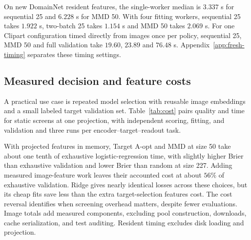 On new DomainNet resident features, the single-worker median is $3.337$ s for sequential 25 and $6.228$ s for MMD 50. With four fitting workers, sequential 25 takes $1.922$ s, two-batch 25 takes $1.154$ s and MMD 50 takes $2.069$ s. For one Clipart configuration timed directly from images once per policy, sequential 25, MMD 50 and full validation take $19.60$, $23.89$ and $76.48$ s. Appendix~\ref{app:fresh-timing} separates these timing settings.

\subsection{Measured decision and feature costs}
\label{sec:cost}
A practical use case is repeated model selection with reusable image embeddings and a small labeled target validation set. Table~\ref{tab:cost} pairs quality and time for static screens at one projection, with independent scoring, fitting, and validation and three runs per encoder--target--readout task.

With projected features in memory, Target A-opt and MMD at size 50 take about one tenth of exhaustive logistic-regression time, with slightly higher Brier than exhaustive validation and lower Brier than random at size 227. Adding measured image-feature work leaves their accounted cost at about $56\%$ of exhaustive validation. Ridge gives nearly identical losses across these choices, but its cheap fits save less than the extra target-selection features cost. The cost reversal identifies when screening overhead matters, despite fewer evaluations. Image totals add measured components, excluding pool construction, downloads, cache serialization, and test auditing. Resident timing excludes disk loading and projection.

\begin{table}[ht]
\centering
\caption{Matched final Brier and mean accounted time in seconds are reported for the two readouts. Resident time includes scoring, fitting, and validation from in-memory projected features. Images adds the separately measured feature work for the fixed pool inventory; it is an additive profile, not a complete pipeline replay. All means use the same timed choices.}
\label{tab:cost}

\end{table}

